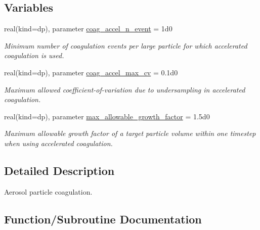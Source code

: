 \subsection*{Variables}
\begin{DoxyCompactItemize}
\item 
real(kind=dp), parameter \mbox{\hyperlink{namespacepmc__coagulation_ae04bc0968f517899ce26a23b550181f5}{coag\+\_\+accel\+\_\+n\+\_\+event}} = 1d0
\begin{DoxyCompactList}\small\item\em Minimum number of coagulation events per large particle for which accelerated coagulation is used. \end{DoxyCompactList}\item 
real(kind=dp), parameter \mbox{\hyperlink{namespacepmc__coagulation_a82e17b9c1710579759ee0d0599b9b4f1}{coag\+\_\+accel\+\_\+max\+\_\+cv}} = 0.\+1d0
\begin{DoxyCompactList}\small\item\em Maximum allowed coefficient-\/of-\/variation due to undersampling in accelerated coagulation. \end{DoxyCompactList}\item 
real(kind=dp), parameter \mbox{\hyperlink{namespacepmc__coagulation_a56c874842d78c24cc24a82623569418e}{max\+\_\+allowable\+\_\+growth\+\_\+factor}} = 1.\+5d0
\begin{DoxyCompactList}\small\item\em Maximum allowable growth factor of a target particle volume within one timestep when using accelerated coagulation. \end{DoxyCompactList}\end{DoxyCompactItemize}


\subsection{Detailed Description}
Aerosol particle coagulation. 

\subsection{Function/\+Subroutine Documentation}
\mbox{\label{namespacepmc__coagulation_a838d22172600c264f9f656ef20310a90}} 

